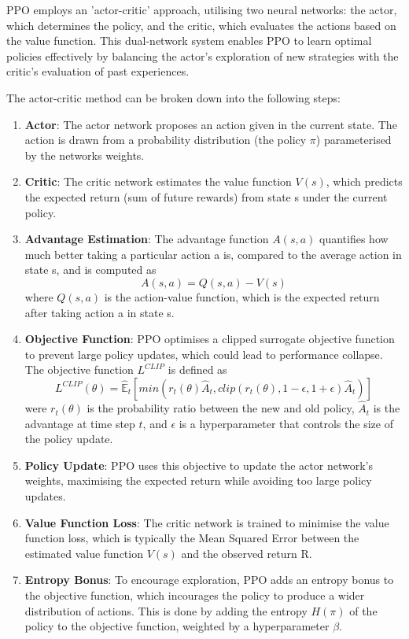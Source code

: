 PPO employs an 'actor-critic' approach, utilising two neural networks: the actor, which determines the policy, and the critic, which evaluates the actions based on the value function. This dual-network system enables PPO to learn optimal policies effectively by balancing the actor's exploration of new strategies with the critic's evaluation of past experiences.

The actor-critic method can be broken down into the following steps:
\begin{enumerate}
    \item \textbf{Actor}: The actor network proposes an action given in the current state. The action is drawn from a probability distribution (the policy $\pi$) parameterised by the networks weights.
    \item \textbf{Critic}: The critic network estimates the value function $V(s)$, which predicts the expected return (sum of future rewards) from state s under the current policy.
    \item \textbf{Advantage Estimation}: The advantage function $A(s,a)$ quantifies how much better taking a particular action a is, compared to the average action in state s, and is computed as 
    \begin{equation}
        A(s,a) = Q(s,a) - V(s)
    \end{equation}
    where $Q(s,a)$ is the action-value function, which is the expected return after taking action a in state s.
    \item \textbf{Objective Function}:  PPO optimises a clipped surrogate objective function to prevent large policy updates, which could lead to performance collapse. The objective function $L^{CLIP}$ is defined as
    \begin{equation}
        L^{CLIP}(\theta) = \hat{\mathbb{E}}_t[min(r_t(\theta)\hat{A}_t, clip(r_t(\theta), 1-\epsilon, 1+\epsilon)\hat{A}_t)]
    \end{equation}
    were $r_t(\theta)$ is the probability ratio between the new and old policy, $\hat{A}_t$ is the advantage at time step $t$, and $\epsilon$ is a hyperparameter that controls the size of the policy update.
    \item \textbf{Policy Update}: PPO uses this objective to update the actor network's weights, maximising the expected return while avoiding too large policy updates.
    \item \textbf{Value Function Loss}: The critic network is trained to minimise the value function loss, which is typically the Mean Squared Error between the estimated value function $V(s)$ and the observed return R.
    \item \textbf{Entropy Bonus}: To encourage exploration, PPO adds an entropy bonus to the objective function, which incourages the policy to produce a wider distribution of actions. This is done by adding the entropy $H(\pi)$ of the policy to the objective function, weighted by a hyperparameter $\beta$.
\end{enumerate}

